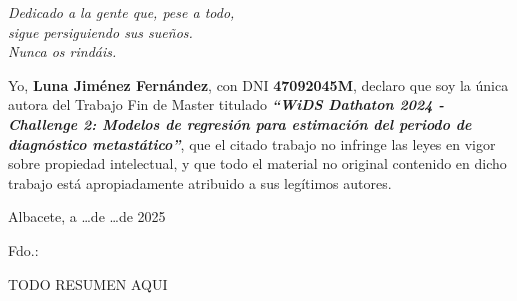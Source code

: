 %
% 



\cleardoublepage
\thispagestyle{empty}

\vspace*{9cm}  
\begin{flushright} \em 
Dedicado a la gente que, pese a todo,\\
sigue persiguiendo sus sueños.\\
Nunca os rindáis.
\end{flushright}


\cleardoublepage
\thispagestyle{plain}
\setcounter{page}{1} \null
\begin{center}
\Large{}
\end{center}
\vskip1cm

Yo, \textbf{Luna Jiménez Fernández}, con DNI \textbf{47092045M}, declaro que soy la única autora del Trabajo Fin de Master titulado \textbf{\textit{``WiDS Dathaton 2024 - Challenge 2: Modelos de regresión para estimación del periodo de diagnóstico metastático''}}, que el citado trabajo no infringe las leyes en vigor sobre propiedad intelectual, y que todo el material no original contenido en dicho trabajo está apropiadamente atribuido a sus legítimos autores.

\vspace*{2cm}
\begin{center}
Albacete, a \quad \ldots \quad de \quad \ldots \quad de 2025

\vskip3cm

Fdo.: \textbf{\autor}
\end{center}


\cleardoublepage
\thispagestyle{plain}
\begin{center}
\Large{}
\end{center}
\vskip1cm

TODO RESUMEN AQUI

\cleardoublepage
\thispagestyle{plain}
\begin{center}
	\Large{}
\end{center}
\vskip1cm

